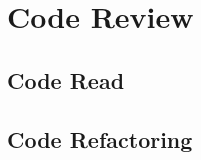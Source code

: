 \documentclass[11pt]{article}
\begin{document}



%





\section{Code Review}

\subsection{Code Read}


\subsection{Code Refactoring}


\end{document}

